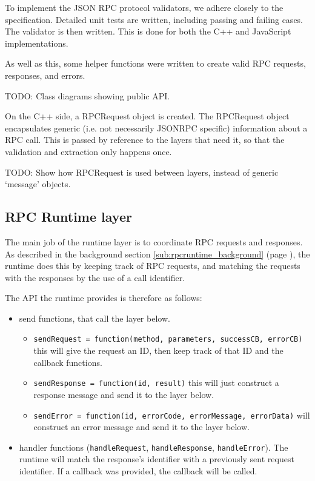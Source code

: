 To implement the JSON RPC protocol validators, we adhere closely to the specification. Detailed unit tests are written, including passing and failing cases. The validator is then written. This is done for both the C++ and JavaScript implementations.

As well as this, some helper functions were written to create valid RPC requests, responses, and errors.

TODO: Class diagrams showing public API.

On the C++ side, a RPCRequest object is created. The RPCRequest object encapsulates generic (i.e. not necessarily JSONRPC specific) information about a RPC call. This is passed by reference to the layers that need it, so that the validation and extraction only happens once.

TODO: Show how RPCRequest is used between layers, instead of generic `message' objects.



\subsection{RPC Runtime layer} %
\label{sub:rpc_runtime_layer_design}
The main job of the runtime layer is to coordinate RPC requests and responses. As described in the background section \ref{sub:rpcruntime_background} (page \pageref{sub:rpcruntime_background}), the runtime does this by keeping track of RPC requests, and matching the requests with the responses by the use of a call identifier.

The API the runtime provides is therefore as follows:
\begin{itemize}
	\item send functions, that call the layer below.
	\begin{itemize}
		\item \lstinline+sendRequest = function(method, parameters, successCB, errorCB)+ this will give the request an ID, then keep track of that ID and the callback functions.
		\item \lstinline+sendResponse = function(id, result)+ this will just construct a response message and send it to the layer below.
		\item \lstinline+sendError = function(id, errorCode, errorMessage, errorData)+ will construct an error message and send it to the layer below.
	\end{itemize}
	\item handler functions (\lstinline+handleRequest+, \lstinline+handleResponse+, \lstinline+handleError+). The runtime will match the response's identifier with a previously sent request identifier. If a callback was provided, the callback will be called.
\end{itemize}

